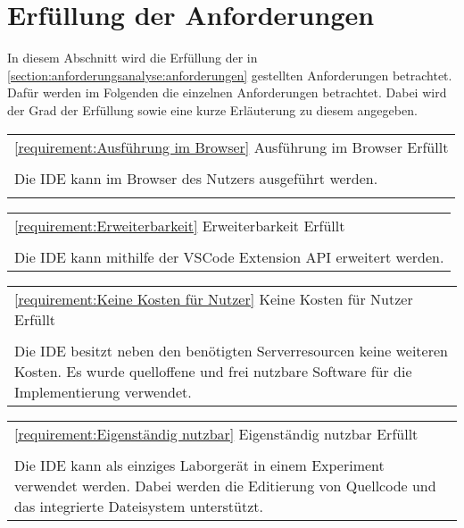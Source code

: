 \section{Erfüllung der Anforderungen}\label{section:diskussion:erfüllung-der-anforderungen}

In diesem Abschnitt wird die Erfüllung der in \autoref{section:anforderungsanalyse:anforderungen} gestellten Anforderungen betrachtet. Dafür werden im Folgenden die einzelnen Anforderungen betrachtet. Dabei wird der Grad der Erfüllung sowie eine kurze Erläuterung zu diesem angegeben.

\begin{tabularx}{\textwidth}{X}
    \toprule
    \autoref{requirement:Ausführung im Browser} \hfill Ausführung im Browser \hfill Erfüllt \\
    \\
    Die IDE kann im Browser des Nutzers ausgeführt werden.                                  \\
    \bottomrule                                                                             \\
\end{tabularx}
\begin{tabularx}{\textwidth}{X}
    \toprule
    \autoref{requirement:Erweiterbarkeit} \hfill Erweiterbarkeit \hfill Erfüllt \\
    \\
    Die IDE kann mithilfe der VSCode Extension API erweitert werden.
    \\
    \bottomrule
\end{tabularx}
\vfill
\begin{tabularx}{\textwidth}{X}
    \toprule
    \autoref{requirement:Keine Kosten für Nutzer} \hfill Keine Kosten für Nutzer \hfill Erfüllt
    \\
    \\
    Die IDE besitzt neben den benötigten Serverresourcen keine weiteren Kosten. Es wurde quelloffene und frei nutzbare Software für die Implementierung verwendet.
    \\
    \bottomrule
\end{tabularx}
\vfill
\begin{tabularx}{\textwidth}{X}
    \toprule
    \autoref{requirement:Eigenständig nutzbar} \hfill Eigenständig nutzbar \hfill Erfüllt
    \\
    \\
    Die IDE kann als einziges Laborgerät in einem Experiment verwendet werden. Dabei werden die Editierung von Quellcode und das integrierte Dateisystem unterstützt.
    \\
    \bottomrule
\end{tabularx}
